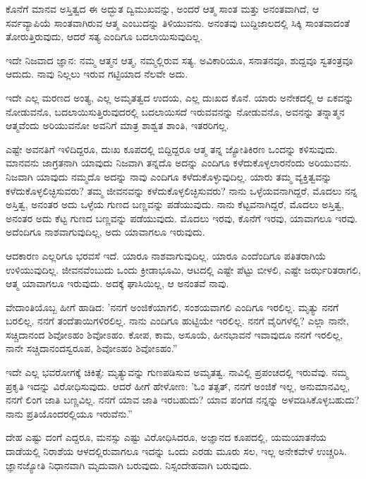 ಕೊನೆಗೆ ಮಾನವ ಅಸ್ತಿತ್ವದ ಈ ಅದ್ಭುತ ದ್ವಿಮುಖವನ್ನು, ಅಂದರೆ ಆತ್ಮ ಸಾಂತ ಮತ್ತು ಅನಂತವಾಗಿದೆ, ಆ ಸರ್ವವ್ಯಾಪಿಯೆ ಸಾಂತವಾಗಿರುವ ಆತ್ಮ ಎಂಬುದನ್ನು ತಿಳಿಯುವನು. ಅನಂತವು ಬುದ್ದಿಜಾಲದಲ್ಲಿ ಸಿಕ್ಕಿ ಸಾಂತವಾದಂತೆ ತೋರುತ್ತಿರುವುದು, ಆದರೆ ಸತ್ಯ ಎಂದಿಗೂ ಬದಲಾಯಿಸುವುದಿಲ್ಲ.

ಇದೇ ನಿಜವಾದ ಜ್ಞಾನ: ನಮ್ಮ ಆತ್ಮನ ಆತ್ಮ, ನಮ್ಮಲ್ಲಿರುವ ಸತ್ಯ. ಅವಿಕಾರಿಯೂ, ಸನಾತನವೂ, ಶುದ್ದವೂ ಸ್ವತಂತ್ರವೂ ಆದುದು. ನಾವು ನಿಲ್ಲಲು ಇರುವ ಗಟ್ಟಿಯಾದ ನೆಲವೇ ಅದು.

ಇದೇ ಎಲ್ಲ ಮರಣದ ಅಂತ್ಯ, ಎಲ್ಲ ಅಮೃತತ್ವದ ಉದಯ, ಎಲ್ಲ ದುಃಖದ ಕೊನೆ. ಯಾರು ಅನೇಕದಲ್ಲಿ ಆ ಏಕವನ್ನು ನೋಡುವನೊ, ಬದಲಾಯಿಸುತ್ತಿರುವುದರಲ್ಲಿ ಬದಲಾಯಿಸದೆ ಇರುವವನನ್ನು ನೋಡುವನೊ, ಅವನನ್ನು ತನ್ನಾತ್ಮನ ಆತ್ಮವೆಂದು ಅರಿಯುವನೋ ಅವನಿಗೆ ಮಾತ್ರ ಶಾಶ್ವತ ಶಾಂತಿ, ಇತರರಿಗಲ್ಲ.

ಎಷ್ಟೇ ಅವನತಿಗೆ ಇಳಿದಿದ್ದರೂ, ದುಃಖ ಕೂಪದಲ್ಲಿ ಬಿದ್ದಿದ್ದರೂ ಆತ್ಮ ತನ್ನ ಜ್ಯೋತಿಕಿರಣ ಒಂದನ್ನು ಕಳಿಸುವುದು. ಮಾನವನು ಜಾಗ್ರತನಾಗಿ ಯಾವುದು ನಿಜವಾಗಿ ತನ್ನದೊ ಅದನ್ನು ಎಂದಿಗೂ ಕಳೆದುಕೊಳ್ಳಲಾರನೆಂದು ಅರಿಯುವನು. ನಿಜವಾಗಿ ಯಾವುದು ನಮ್ಮದೊ ಅದನ್ನು ನಾವು ಎಂದಿಗೂ ಕಳೆದುಕೊಳ್ಳುವುದಿಲ್ಲ. ಯಾರು ತಮ್ಮ ವ್ಯಕ್ತಿತ್ವವನ್ನು ಕಳೆದುಕೊಳ್ಳಲಿಚ್ಛಿಸುವರು? ತಮ್ಮ ಜೀವನವನ್ನು ಕಳೆದುಕೊಳ್ಳಲಿಚ್ಛಿಸುವರು? ನಾನು ಒಳ್ಳೆಯವನಾಗಿದ್ದರೆ, ಮೊದಲು ನನ್ನ ಅಸ್ತಿತ್ವ, ಅನಂತರ ಅದು ಒಳ್ಳೆಯ ಗುಣದ ಬಣ್ಣವನ್ನು ಪಡೆಯುವುದು. ನಾನು ಕೆಟ್ಟವನಾಗಿದ್ದರೆ, ಮೊದಲು ಅಸ್ತಿತ್ವ, ಅನಂತರ ಅದು ಕೆಟ್ಟ ಗುಣದ ಬಣ್ಣವನ್ನು ಪಡೆಯುವುದು. ಮೊದಲು ಇರವು, ಕೊನೆಗೆ ಇರವು, ಯಾವಾಗಲೂ ಇರವು. ಅದೆಂದಿಗೂ ನಾಶವಾಗುವುದಿಲ್ಲ, ಅದು ಯಾವಾಗಲೂ ಇರುವುದು.

ಆದಕಾರಣ ಎಲ್ಲರಿಗೂ ಭರವಸೆ ಇದೆ. ಯಾರೂ ನಾಶವಾಗುವುದಿಲ್ಲ. ಯಾರೂ ಎಂದೆಂದಿಗೂ ಪತಿತರಾಗಿಯೆ ಉಳಿಯುವುದಿಲ್ಲ. ಜೀವನವೆಂಬುದು ಒಂದು ಕ್ರೀಡಾಭೂಮಿ, ಆಟದಲ್ಲಿ ಎಷ್ಟೇ ಪೆಟ್ಟು ಬೀಳಲಿ, ಎಷ್ಟೇ ಜರ್ಝರಿತರಾಗಲಿ, ಆತ್ಮ ಯಾವಾಗಲೂ ಇರುವುದು. ಅದಕ್ಕೆ ಘಾಸಿಯಿಲ್ಲ, ಆ ಅನಂತವೆ ನಾವು.

ವೇದಾಂತಿಯೊಬ್ಬ ಹೀಗೆ ಹಾಡಿದ: 'ನನಗೆ ಅಂಜಿಕೆಯಾಗಲಿ, ಸಂಶಯವಾಗಲಿ ಎಂದಿಗೂ ಇರಲಿಲ್ಲ. ಮೃತ್ಯು ನನಗೆ ಬರಲಿಲ್ಲ. ನನಗೆ ತಂದೆತಾಯಿಗಳಿರಲಿಲ್ಲ. ನಾನು ಎಂದಿಗೂ ಹುಟ್ಟಿಯೇ ಇರಲಿಲ್ಲ. ನನಗೆ ವೈರಿಗಳೆಲ್ಲಿ? ಎಲ್ಲಾ ನಾನೇ, ಸಚ್ಚಿದಾನಂದ ಶಿವೋಽಹಂ ಶಿವೋಽಹಂ. ಕೋಪ, ಕಾಮ, ಅಸೂಯೆ, ಹೀನಭಾವನೆ ಇವಾವುದೂ ನನಗೆ ಇರಲಿಲ್ಲ, ನಾನೇ ಸಚ್ಚಿದಾನಂದಸ್ವರೂಪ, ಶಿವೋಽಹಂ ಶಿವೋಽಹಂ.''

ಇದೇ ಎಲ್ಲ ಭವರೋಗಕ್ಕೆ ಚಿಕಿತ್ಸೆ: ಮೃತ್ಯುವನ್ನು ಗುಣಪಡಿಸುವ ಅಮೃತತ್ವ. ನಾವಿಲ್ಲಿ ಪ್ರಪಂಚದಲ್ಲಿ ಇರುವೆವು. ನಮ್ಮ ಪ್ರಕೃತಿ ಇದನ್ನು ವಿರೋಧಿಸುವುದು. ಆದರೆ ಹೀಗೆ ಹೇಳೋಣ: 'ಓಂ ತತ್ಸತ್, ನನಗೆ ಅಂಜಿಕೆ ಇಲ್ಲ, ಅನುಮಾನವಿಲ್ಲ, ನನಗೆ ಲಿಂಗ ಜಾತಿ ಬಣ್ಣವಿಲ್ಲ. ನನಗೆ ಯಾವ ಜಾತಿ ಇರಬಹುದು? ಯಾವ ಪಂಗಡ ನನ್ನನ್ನು ಅಳವಡಿಸಿಕೊಳ್ಳಬಹುದು? ನಾನು ಪ್ರತಿಯೊಂದರಲ್ಲಿಯೂ ಇರುವೆನು.”

ದೇಹ ಎಷ್ಟು ದಂಗೆ ಎದ್ದರೂ, ಮನಸ್ಸು ಎಷ್ಟು ವಿರೋಧಿಸಿದರೂ, ಅಜ್ಞಾನದ ಕೂಪದಲ್ಲಿ, ಯಮಯಾತನೆಯ ದಾಡೆಯಲ್ಲಿ ನಿರಾಶೆಯ ಆಳದಲ್ಲಿರುವಾಗಲೂ ಇದನ್ನು ಒಂದು ಎರಡು ಮೂರು ಸಲ, ಇಲ್ಲ ಅನೇಕವೇಳೆ ಉಚ್ಚರಿಸಿ. ಜ್ಞಾನಜ್ಯೋತಿ ನಿಧಾನವಾಗಿ ಮೃದುವಾಗಿ ಬರುವುದು. ನಿಸ್ಸಂದೇಹವಾಗಿ ಬರುವುದು.


